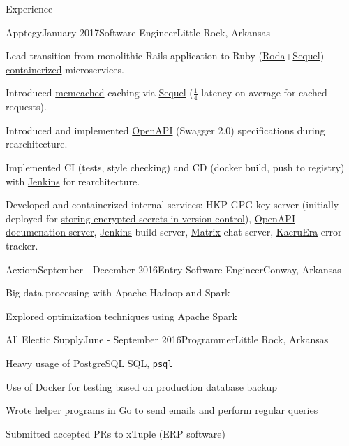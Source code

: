 \documentclass{resume} %
\begin{document}
\begin{rSection}{Experience}

\begin{rSubsection}{Apptegy}{January 2017}{Software Engineer}{Little Rock, Arkansas}

	\item Lead transition from monolithic Rails application to Ruby (\href{http://roda.jeremyevans.net/}{Roda}+\href{http://sequel.jeremyevans.net/}{Sequel}) \href{https://www.docker.com/}{containerized} microservices.
	\item Introduced \href{https://memcached.org/}{memcached} caching via \href{http://sequel.jeremyevans.net/rdoc-plugins/classes/Sequel/Plugins/Caching.html}{Sequel} ($\frac{1}{4}$ latency on average for cached requests).
	\item Introduced and implemented \href{https://www.openapis.org/}{OpenAPI} (Swagger 2.0) specifications during rearchitecture.
	\item Implemented CI (tests, style checking) and CD (docker build, push to registry) with \href{https://jenkins.io/}{Jenkins} for rearchitecture.
	\item Developed and containerized internal services: HKP GPG key server (initially deployed for \href{https://github.com/AGWA/git-crypt}{storing encrypted secrets in version control}), \href{https://www.openapis.org/}{OpenAPI} \href{https://github.com/Rebilly/ReDoc}{documenation server}, \href{https://jenkins.io/}{Jenkins} build server, \href{https://matrix.org/}{Matrix} chat server, \href{https://github.com/jeremyevans/kaeruera}{KaeruEra} error tracker.
\end{rSubsection}

\begin{rSubsection}{Acxiom}{September - December 2016}{Entry Software Engineer}{Conway, Arkansas}

	\item Big data processing with Apache Hadoop and Spark
	\item Explored optimization techniques using Apache Spark
\end{rSubsection}


\begin{rSubsection}{All Electic Supply}{June - September 2016}{Programmer}{Little Rock, Arkansas}

	\item Heavy usage of PostgreSQL SQL, {\tt psql}
	\item Use of Docker for testing based on production database backup
	\item Wrote helper programs in Go to send emails and perform regular queries
	\item Submitted accepted PRs to xTuple (ERP software)
\end{rSubsection}


\end{rSection}
\end{document}
